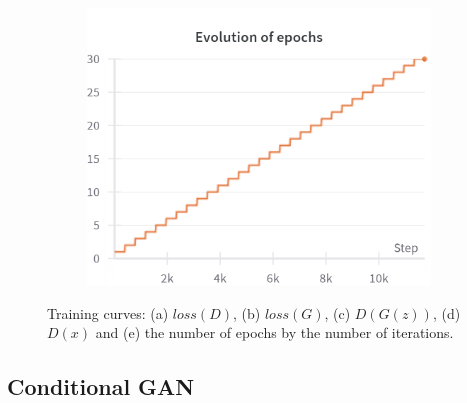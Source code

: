 \begin{figure}[H]
    \begin{subfigure}{0.45\textwidth}
        \centering
        \includegraphics[width=0.95\linewidth]{cifar10/64_nz100/epochs.png}
        \caption{}
        \label{subfig:cifar10/64_nz100/epochs}
    \end{subfigure}%

    \caption{Training curves: (a) $loss(D)$, (b) $loss(G)$, (c) $D(G(z))$, (d) $D(x)$ and (e) the number of epochs by the number of iterations.}
    \label{fig:cifar10_64_nz100_curves}
\end{figure}

\subsection{Conditional GAN} \label{appendix:cDCGAN}


